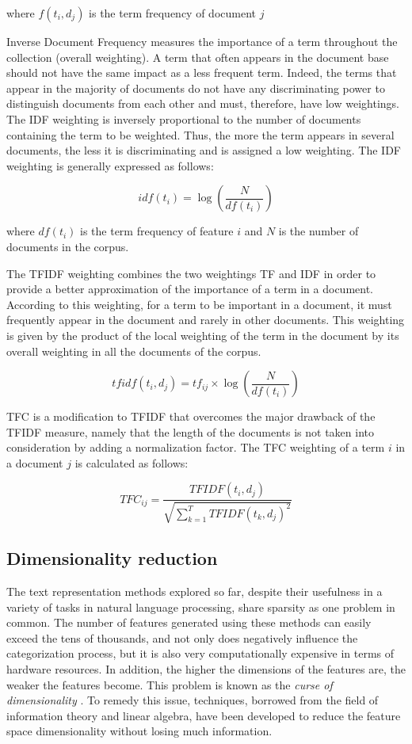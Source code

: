 where $f(t_{i},d_{j})$ is the term frequency of document $j$

Inverse Document Frequency measures the importance of a term throughout the collection (overall weighting). A term that often appears in the document base should not have the same impact as a less frequent term. Indeed, the terms that appear in the majority of documents do not have any discriminating power to distinguish documents from each other and must, therefore, have low weightings. The IDF weighting is inversely proportional to the number of documents containing the term to be weighted. Thus, the more the term appears in several documents, the less it is discriminating and is assigned a low weighting. The IDF weighting is generally expressed as follows:

$$i d f \left( t _ { i } \right) = \log \left( \frac { N } { d f \left( t _ { i } \right) } \right)$$

where $df(t_{i})$ is the term frequency of feature $i$ and $N$ is the number of documents in the corpus.

The TFIDF weighting combines the two weightings TF and IDF in order to
provide a better approximation of the importance of a term in a
document. According to this weighting, for a term to be important in a
document, it must frequently appear in the document and rarely in other
documents. This weighting is given by the product of the local weighting
of the term in the document by its overall weighting in all the
documents of the corpus.

$$t f i d f \left( t _ { i } , d _ { j } \right) = t f _ { i j } \times \log \left( \frac { N } { d f \left( t _ { i } \right) } \right)$$


TFC is a modification to TFIDF that overcomes the major drawback of the
TFIDF measure, namely that the length of the documents is not taken into
consideration by adding a normalization factor. The TFC weighting of a
term $i$ in a document $j$ is calculated as follows:

$$T F C _ { i j } = \frac { T F I D F \left( t _ { i } , d _ { j } \right) } { \sqrt { \sum _ { k = 1 } ^ { T } T F I D F \left( t _ { k } , d _ { j } \right) ^ { 2 } } }$$

\subsection{Dimensionality reduction}

The text representation methods explored so far, despite their usefulness in a variety of tasks in natural language processing, share sparsity as one problem in common. The number of features generated using these methods can easily exceed the tens of thousands, and not only does negatively influence the categorization process, but it is also very computationally expensive in terms of hardware resources. In addition, the higher the dimensions of the features are, the weaker the features become. This problem is known as the \emph{curse of dimensionality} \citep{bellman2015adaptive}. To remedy this issue,  techniques, borrowed from the field of information theory and linear algebra, have been developed to reduce the feature space dimensionality without losing much information. 

